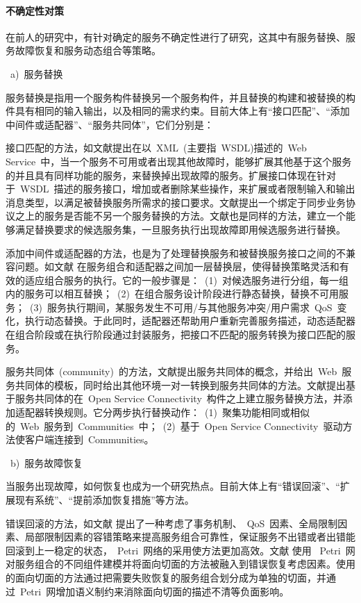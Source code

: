 \paragraph{不确定性对策}

在前人的研究中，有针对确定的服务不确定性进行了研究，这其中有服务替换、服务故障恢复和服务动态组合等策略。

~a)~服务替换

服务替换是指用一个服务构件替换另一个服务构件，并且替换的构建和被替换的构件具有相同的输入输出，以及相同的需求约束。目前大体上有“接口匹配”、“添加中间件或适配器”、“服务共同体”，它们分别是：

接口匹配的方法，如文献\cite{ponnekanti2004interoperability}提出在以~XML~(主要指~WSDL)描述的~Web Service~中，当一个服务不可用或者出现其他故障时，能够扩展其他基于这个服务的并且具有同样功能的服务，来替换掉出现故障的服务。扩展接口体现在针对于~WSDL~描述的服务接口，增加或者删除某些操作，来扩展或者限制输入和输出消息类型，以满足被替换服务所需求的接口要求。文献\cite{benatallah2005temporal}提出一个绑定于同步业务协议之上的服务是否能不另一个服务替换的方法。文献\cite{salas2006ws}也是同样的方法，建立一个能够满足替换要求的候选服务集，一旦服务执行出现故障即用候选服务进行替换。

添加中间件或适配器的方法，也是为了处理替换服务和被替换服务接口之间的不兼容问题。如文献\cite{chen2008web} 在服务组合和适配器之间加一层替换层，使得替换策略灵活和有效的适应组合服务的执行。它的一般步骤是：~(1)~对候选服务进行分组，每一组内的服务可以相互替换；~(2)~在组合服务设计阶段进行静态替换，替换不可用服务；~(3)~服务执行期间，某服务发生不可用/与其他服务冲突/用户需求~QoS~变化，执行动态替换。于此同时，适配器还帮助用户重新完善服务描述，动态适配器在组合阶段或在执行阶段通过封装服务，把接口不匹配的服务转换为接口匹配的服务。

服务共同体~(community)~的方法，文献\cite{medjahed2005dynamic}提出服务共同体的概念，并给出~Web~服务共同体的模板，同时给出其他环境一对一转换到服务共同体的方法。文献\cite{taher2006towards}提出基于服务共同体的在~Open Service Connectivity~构件之上建立服务替换方法，并添加适配器转换规则。它分两步执行替换动作：~(1)~聚集功能相同或相似的~Web~服务到~Communities~中；~(2)~基于~Open Service Connectivity~驱动方法使客户端连接到~Communities。~

~b)~服务故障恢复

当服务出现故障，如何恢复也成为一个研究热点。目前大体上有“错误回滚”、“扩展现有系统”、“提前添加恢复措施”等方法。

错误回滚的方法，如文献\cite{yu2010fault} 提出了一种考虑了事务机制、~QoS~因素、全局限制因素、局部限制因素的容错策略来提高服务组合可靠性，保证服务不出错或者出错能回滚到上一稳定的状态，~Petri~网络的采用使方法更加高效。文献\cite{fan2011approach} 使用
~Petri~网对服务组合的不同组件建模并将面向切面的方法被融入到错误恢复考虑因素。使用的面向切面的方法通过把需要失败恢复的服务组合划分成为单独的切面，并通过~Petri~网增加语义制约来消除面向切面的描述不清等负面影响。

